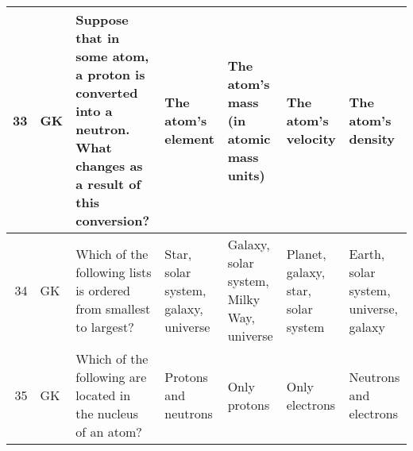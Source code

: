 \documentclass[10pt]{article}
\begin{document}
\begin{tiny}
\begin{longtable}{r|p{0.375in}|p{1.275in}|p{0.75in}|p{0.75in}|p{0.75in}|p{0.75in}}
    33    &      GK &                                                                                                                                                                    Suppose that in some atom, a proton is converted into a neutron. What changes as a result of this conversion? &                                                                                                                    The atom's element &                                                                The atom's mass (in atomic mass units) &                                                                                                        The atom's velocity &                                                                                                                The atom's density \\\hline
    34    &      GK &                                                                                                                                                                                                                Which of the following lists is ordered from smallest to largest? &                                                                                                  Star, solar system, galaxy, universe &                                                             Galaxy, solar system, Milky Way, universe &                                                                                         Planet, galaxy, star, solar system &                                                                                             Earth, solar system, universe, galaxy \\\hline
    35    &      GK &                                                                                                                                                                                                                    Which of the following are located in the nucleus of an atom? &                                                                                                                  Protons and neutrons &                                                                                          Only protons &                                                                                                             Only electrons &                                                                                                            Neutrons and electrons \\\hline

\end{longtable}
\end{tiny}
\end{document}
